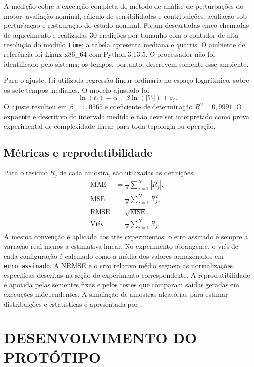 \documentclass[12pt,openright,oneside,a4paper,brazil]{abntex2}
\begin{document}
A medição cobre a execução completa do método de análise de perturbações do motor: avaliação nominal, cálculo de sensibilidades e contribuições, avaliação sob perturbação e restauração do estado nominal. Foram descartadas cinco chamadas de aquecimento e realizadas 30 medições por tamanho com o contador de alta resolução do módulo \texttt{time}; a tabela apresenta mediana e quartis. O ambiente de referência foi Linux x86\_64 com Python 3.13.5. O processador não foi identificado pelo sistema; os tempos, portanto, descrevem somente esse ambiente.

Para o ajuste, foi utilizada regressão linear ordinária no espaço logarítmico, sobre os sete tempos medianos. O modelo ajustado foi
\begin{equation}
\ln(t_i)=\alpha+\beta\ln(|V_i|)+\varepsilon_i.
\end{equation}
O ajuste resultou em $\beta=1{,}0565$ e coeficiente de determinação $R^2=0{,}9991$. O expoente é descritivo do intervalo medido e não deve ser interpretado como prova experimental de complexidade linear para toda topologia ou operação.

\section{Métricas e reprodutibilidade}
Para o resíduo $R_j$ de cada amostra, são utilizadas as definições
\begin{align}
\mathrm{MAE}&=\frac{1}{N}\sum_{j=1}^{N}|R_j|,\\
\mathrm{MSE}&=\frac{1}{N}\sum_{j=1}^{N}R_j^2,\\
\mathrm{RMSE}&=\sqrt{\mathrm{MSE}},\\
\text{Viés}&=\frac{1}{N}\sum_{j=1}^{N}R_j.
\end{align}
A mesma convenção é aplicada aos três experimentos: o erro assinado é sempre a variação real menos a estimativa linear. No experimento abrangente, o viés de cada configuração é calculado como a média dos valores armazenados em \texttt{erro\_assinado}.
A NRMSE e o erro relativo médio seguem as normalizações específicas descritas na seção do experimento correspondente. A reprodutibilidade é apoiada pelas sementes fixas e pelos testes que comparam saídas geradas em execuções independentes. A simulação de amostras aleatórias para estimar distribuições e estatísticas é apresentada por .

\chapter{DESENVOLVIMENTO DO PROTÓTIPO}
\end{document}
